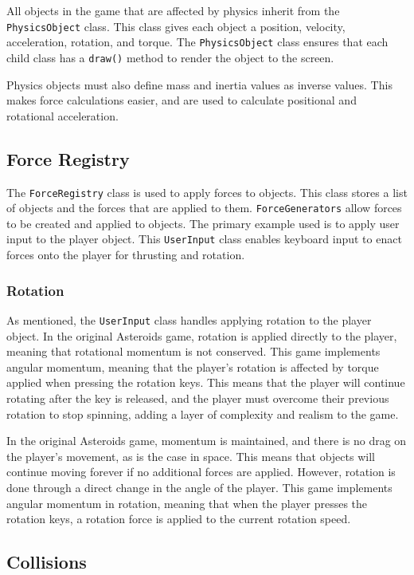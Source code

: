 \documentclass[12pt, a4paper]{article}
\begin{document}
All objects in the game that are affected by physics inherit from the \texttt{PhysicsObject} class. This class gives each object a position, velocity, acceleration, rotation, and torque. The \texttt{PhysicsObject} class ensures that each child class has a \texttt{draw()} method to render the object to the screen. 

Physics objects must also define mass and inertia values as inverse values. This makes force calculations easier, and are used to calculate positional and rotational acceleration.

\subsection{Force Registry}

The \texttt{ForceRegistry} class is used to apply forces to objects. This class stores a list of objects and the forces that are applied to them. \texttt{ForceGenerators} allow forces to be created and applied to objects. The primary example used is to apply user input to the player object. This \texttt{UserInput} class enables keyboard input to enact forces onto the player for thrusting and rotation. 

\subsubsection{Rotation}

As mentioned, the \texttt{UserInput} class handles applying rotation to the player object. In the original Asteroids game, rotation is applied directly to the player, meaning that rotational momentum is not conserved. This game implements angular momentum, meaning that the player's rotation is affected by torque applied when pressing the rotation keys. This means that the player will continue rotating after the key is released, and the player must overcome their previous rotation to stop spinning, adding a layer of complexity and realism to the game.

In the original Asteroids game, momentum is maintained, and there is no drag on the player's movement, as is the case in space. This means that objects will continue moving forever if no additional forces are applied. However, rotation is done through a direct change in the angle of the player. This game implements angular momentum in rotation, meaning that when the player presses the rotation keys, a rotation force is applied to the current rotation speed.

\subsection{Collisions}
\end{document}
